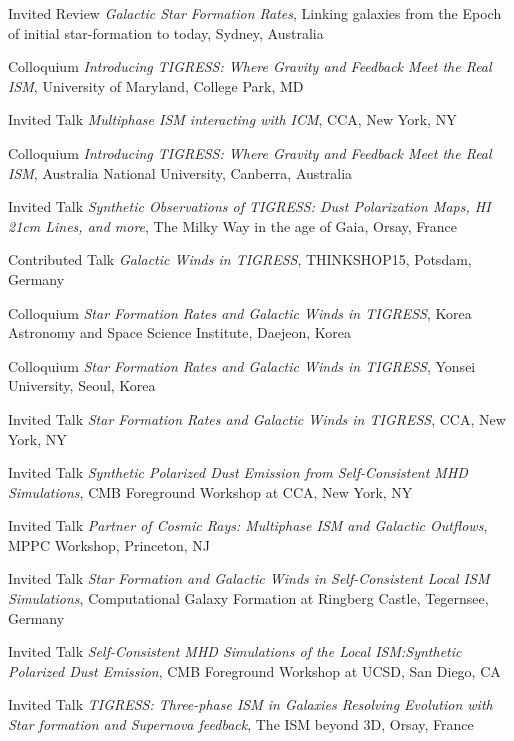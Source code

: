 \documentclass[12pt]{article}
\begin{document}
{Invited Review}
{\emph{Galactic Star Formation Rates},
Linking galaxies from the Epoch of initial star-formation to today,
Sydney, Australia}

{Colloquium}
{\emph{Introducing TIGRESS: Where Gravity and Feedback Meet the Real ISM},
University of Maryland,
College Park, MD}

{Invited Talk}
{\emph{Multiphase ISM interacting with ICM},
CCA,
New York, NY}

{Colloquium}
{\emph{Introducing TIGRESS: Where Gravity and Feedback Meet the Real ISM},
Australia National University,
Canberra, Australia}

{Invited Talk}
{\emph{Synthetic Observations of TIGRESS: Dust Polarization Maps, HI 21cm Lines, and more},
The Milky Way in the age of Gaia,
Orsay, France}

{Contributed Talk}
{\emph{Galactic Winds in TIGRESS},
THINKSHOP15,
Potsdam, Germany}

{Colloquium}
{\emph{Star Formation Rates and Galactic Winds in TIGRESS},
Korea Astronomy and Space Science Institute,
Daejeon, Korea}

{Colloquium}
{\emph{Star Formation Rates and Galactic Winds in TIGRESS},
Yonsei University,
Seoul, Korea}

{Invited Talk}
{\emph{Star Formation Rates and Galactic Winds in TIGRESS},
CCA,
New York, NY}

{Invited Talk}
{\emph{Synthetic Polarized Dust Emission from Self-Consistent MHD Simulations},
CMB Foreground Workshop at CCA,
New York, NY}

{Invited Talk}
{\emph{Partner of Cosmic Rays: Multiphase ISM and Galactic Outflows},
MPPC Workshop,
Princeton, NJ}

{Invited Talk}
{\emph{Star Formation and Galactic Winds in Self-Consistent Local ISM Simulations},
Computational Galaxy Formation at Ringberg Castle,
Tegernsee, Germany}

{Invited Talk}
{\emph{Self-Consistent MHD Simulations of the Local ISM:Synthetic Polarized Dust Emission},
CMB Foreground Workshop at UCSD,
San Diego, CA}

{Invited Talk}
{\emph{TIGRESS: Three-phase ISM in Galaxies Resolving Evolution with Star formation and Supernova feedback},
The ISM beyond 3D,
Orsay, France}
\end{document}
